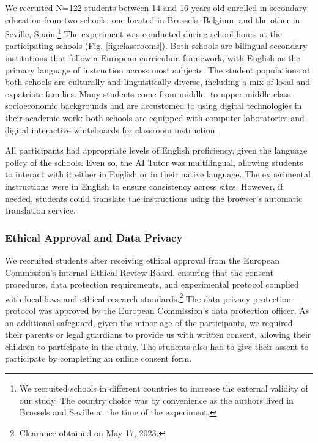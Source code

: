 \documentclass[
  11pt,
]{article}
\begin{document}
We recruited N=122 students between 14 and 16 years old enrolled in secondary education from two schools: one located in Brussels, Belgium, and the other in Seville, Spain.\footnote{We recruited schools in different countries to increase the external validity of our study. The country choice was by convenience as the authors lived in Brussels and Seville at the time of the experiment.} The experiment was conducted during school hours at the participating schools (Fig. \ref{fig:classrooms}). Both schools are bilingual secondary institutions that follow a European curriculum framework, with English as the primary language of instruction across most subjects. The student populations at both schools are culturally and linguistically diverse, including a mix of local and expatriate families. Many students come from middle- to upper-middle-class socioeconomic backgrounds and are accustomed to using digital technologies in their academic work: both schools are equipped with computer laboratories and digital interactive whiteboards for classroom instruction.

All participants had appropriate levels of English proficiency, given the language policy of the schools. Even so, the AI Tutor was multilingual, allowing students to interact with it either in English or in their native language. The experimental instructions were in English to ensure consistency across sites. However, if needed, students could translate the instructions using the browser's automatic translation service.

\subsubsection{Ethical Approval and Data Privacy}\label{ethical-approval-and-data-privacy}

We recruited students after receiving ethical approval from the European Commission's internal Ethical Review Board, ensuring that the consent procedures, data protection requirements, and experimental protocol complied with local laws and ethical research standards.\footnote{Clearance obtained on May 17, 2023.} The data privacy protection protocol was approved by the European Commission's data protection officer. As an additional safeguard, given the minor age of the participants, we required their parents or legal guardians to provide us with written consent, allowing their children to participate in the study. The students also had to give their assent to participate by completing an online consent form.
\end{document}
